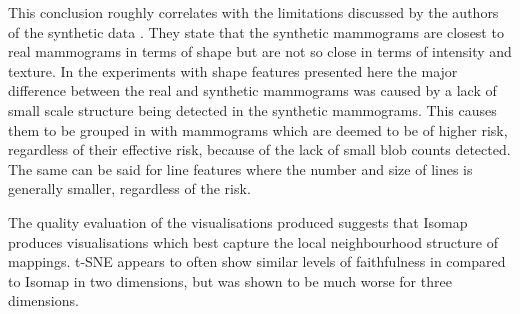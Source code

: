 This conclusion roughly correlates with the limitations discussed by the authors of the synthetic data \cite{bakic2002mammogram1, bakic2002mammogram2, bakic2003mammogram3}. They state that the synthetic mammograms are closest to real mammograms in terms of shape but are not so close in terms of intensity and texture. In the experiments with shape features presented here the major difference between the real and synthetic mammograms was caused by a lack of small scale structure being detected in the synthetic mammograms. This causes them to be grouped in with mammograms which are deemed to be of higher risk, regardless of their effective risk, because of the lack of small blob counts detected. The same can be said for line features where the number and size of lines is generally smaller, regardless of the risk.

The quality evaluation of the visualisations produced suggests that Isomap produces visualisations which best capture the local neighbourhood structure of mappings. t-SNE appears to often show similar levels of faithfulness in compared to Isomap in two dimensions, but was shown to be much worse for three dimensions.


